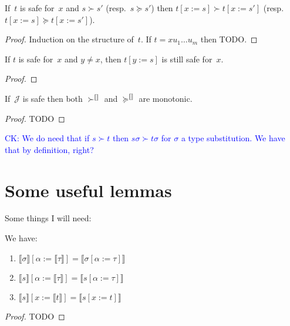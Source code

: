 \documentclass[runningheads,a4paper]{llncs}
\newcommand{\Termmap}{\mathcal{J}}
\newcommand{\succinterpret}{\succ^{\llbracket\rrbracket}}
\newcommand{\succeqinterpret}{\succeq^{\llbracket\rrbracket}}
\newcommand{\typeinterpret}[1]{\llbracket #1 \rrbracket}
\newcommand{\interpret}[1]{\llbracket #1 \rrbracket}
\newcommand{\subst}[2]{#1:=#2}
\newcommand{\CK}[1]{\textcolor{blue}{CK: #1}}
\begin{document}
\begin{lemma}
  If~$t$ is safe for~$x$ and $s \succ s'$ (resp.~$s \succeq s'$) then
  $t[\subst{x}{s}] \succ t[\subst{x}{s'}]$ (resp.~$t[\subst{x}{s}]
  \succeq t[\subst{x}{s'}]$).
\end{lemma}

\begin{proof}
  Induction on the structure of~$t$. If $t = x u_1 \ldots u_m$ then
  TODO.
\end{proof}

\begin{lemma}
  If $t$ is safe for~$x$ and $y \ne x$, then $t[\subst{y}{s}]$ is
  still safe for~$x$.
\end{lemma}

\begin{proof}
\end{proof}

\begin{lemma}
  If~$\Termmap$ is safe then both $\succinterpret$ and
  $\succeqinterpret$ are monotonic.
\end{lemma}

\begin{proof}
  TODO
\end{proof}

\CK{We do need that if $s \succ t$ then $s\sigma \succ t\sigma$ for
$\sigma$ a type substitution.  We have that by definition, right?}

\section{Some useful lemmas}

Some things I will need:

\begin{lemma}\label{lem:substitutioninterpret}
We have:
\begin{enumerate}
\item\label{lem:substitutioninterpret:types}
  $\typeinterpret{\sigma}[\alpha:=\typeinterpret{\tau}] =
  \typeinterpret{\sigma[\alpha:=\tau]}$
\item\label{lem:substitutioninterpret:mixed}
  $\interpret{s}[\alpha:=\typeinterpret{\tau}] =
  \interpret{s[\alpha:=\tau]}$
\item\label{lem:substitutioninterpret:terms}
  $\interpret{s}[x:=\interpret{t}] = \interpret{s[x:=t]}$
\end{enumerate}
\end{lemma}

\begin{proof}
TODO
\end{proof}
\end{document}
